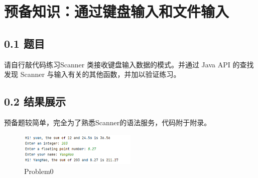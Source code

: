 \vspace{-3cm}\chapter{预备知识：通过键盘输入和文件输入}

\section{0.1 题目}
请自行敲代码练习Scanner 类接收键盘输入数据的模式。并通过 Java API 的查找发现 Scanner 与输入有关的其他函数，并加以验证练习。

\section{0.2 结果展示}
预备题较简单，完全为了熟悉Scanner的语法服务，代码附于附录。

\begin{figure}[H]
    \centering
    \includegraphics[width = 0.5\textwidth]{../pic/0.png}
    \caption{Problem0}
\end{figure}


